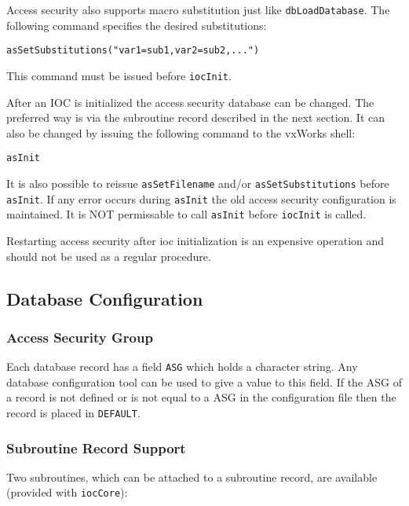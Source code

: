 Access security also supports macro substitution just like \verb|dbLoadDatabase|. The following command specifies the 
desired substitutions:

\begin{verbatim}
asSetSubstitutions("var1=sub1,var2=sub2,...")
\end{verbatim}

This command must be issued before \verb|iocInit|.

After an IOC is initialized the access security database can be changed. The preferred way is via the subroutine record 
described in the next section. It can also be changed by issuing the following command to the vxWorks shell:

\begin{verbatim}
asInit
\end{verbatim}

It is also possible to reissue \verb|asSetFilename| and/or \verb|asSetSubstitutions| before \verb|asInit|. If any error occurs 
during \verb|asInit| the old access security configuration is maintained. It is NOT permissable to call \verb|asInit| before 
\verb|iocInit| is called. 

Restarting access security after ioc initialization is an expensive operation and should not be used as a regular procedure.

\subsection{Database Configuration}



\subsubsection{Access Security Group}

Each database record has a field \verb|ASG| which holds a character string. Any database configuration tool can be used to give 
a value to this field. If the ASG of a record is not defined or is not equal to a ASG in the configuration file then the record 
is placed in \verb|DEFAULT|. 

\subsubsection{Subroutine Record Support}

Two subroutines, which can be attached to a subroutine record, are available (provided with \verb|iocCore|):

